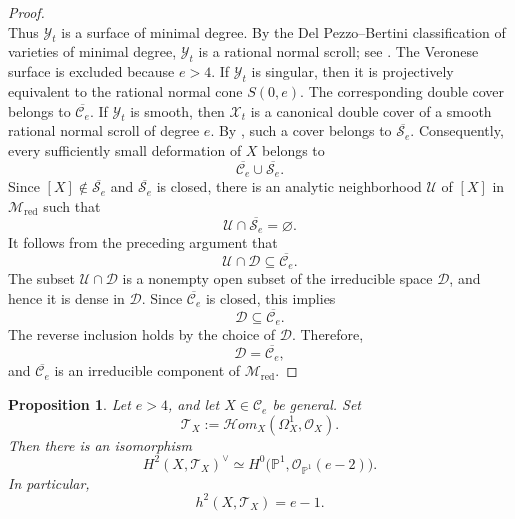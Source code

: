 \documentclass[11pt,twoside]{amsart}
\theoremstyle{plain}
\numberwithin{equation}{section}
\newtheorem{proposition}[theorem]{Proposition}
\theoremstyle{definition}
\begin{document}
\begin{proof}
$$$$
Thus $\mathcal{Y}_t$ is a surface of minimal degree. By the Del Pezzo--Bertini
classification of varieties of minimal degree, $\mathcal{Y}_t$ is a rational normal
scroll; see \cite{EH87}. The Veronese surface is excluded because
$e>4$. If $\mathcal{Y}_t$ is singular, then it is projectively equivalent to the rational normal
cone $S(0,e)$. The corresponding double cover belongs to
$\overline{\mathcal C_e}$. If $\mathcal{Y}_t$ is smooth, then $\mathcal{X}_t$ is a canonical double cover of a smooth rational
normal scroll of degree $e$. By
, such a cover belongs to
$\overline{\mathcal S_e}$. Consequently, every sufficiently small deformation
of $X$ belongs to
$$
\overline{\mathcal C_e}\cup\overline{\mathcal S_e}.
$$
Since $[X]\notin\overline{\mathcal S_e}$ and
$\overline{\mathcal S_e}$ is closed, there is an analytic neighborhood
$\mathcal U$ of $[X]$ in $\mathcal M_{\mathrm{red}}$ such that
$$
\mathcal U\cap\overline{\mathcal S_e}
=
\varnothing.
$$
It follows from the preceding argument that
$$
\mathcal U\cap\mathcal D
\subseteq
\overline{\mathcal C_e}.
$$
The subset $\mathcal U\cap\mathcal D$ is a nonempty open subset of the
irreducible space $\mathcal D$, and hence it is dense in $\mathcal D$. Since
$\overline{\mathcal C_e}$ is closed, this implies
$$
\mathcal D\subseteq\overline{\mathcal C_e}.
$$
The reverse inclusion holds by the choice of $\mathcal D$. Therefore,
$$
\mathcal D=\overline{\mathcal C_e},
$$
and $\overline{\mathcal C_e}$ is an irreducible component of
$\mathcal M_{\mathrm{red}}$.
\end{proof}

\begin{proposition}\label{prop:H2-tangent}
Let $e>4$, and let $X\in\mathcal C_e$ be general. Set
\[
\mathcal T_X
:=
\mathcal Hom_X(\Omega_X^1,\mathcal O_X).
\]
Then there is an isomorphism
\[
H^2(X,\mathcal T_X)^\vee
\simeq
H^0\bigl(\mathbb P^1,\mathcal O_{\mathbb P^1}(e-2)\bigr).
\]
In particular,
\[
h^2(X,\mathcal T_X)=e-1.
\]
\end{proposition}
\end{document}
